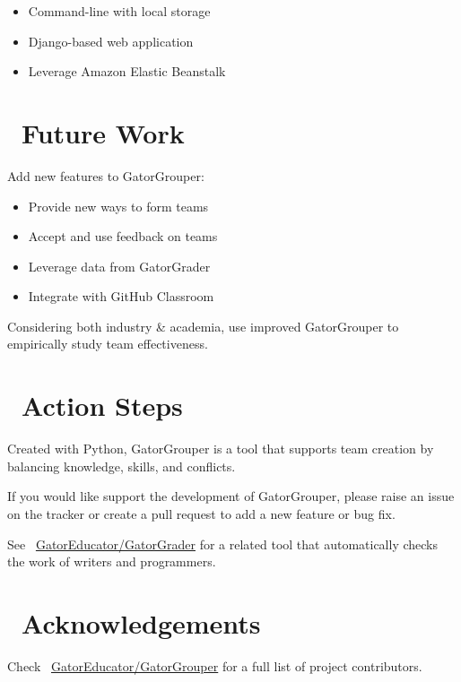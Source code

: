 \documentclass[a0paper,fleqn]{betterposter}
\begin{document}
{\begin{itemize}[leftmargin=*]
    \item{Command-line with local storage}
    \item{Django-based web application}
    \item{Leverage Amazon Elastic Beanstalk}

  \end{itemize}

  \section{\faDashboard~Future Work}
  Add new features to GatorGrouper: \\
  \vspace*{-.5in}

  \begin{itemize}[leftmargin=*]

    \item{Provide new ways to form teams}
    \item{Accept and use feedback on teams}
    \item{Leverage data from GatorGrader}
    \item{Integrate with GitHub Classroom}

  \end{itemize}

  \vspace{.5em}
  Considering both industry \& academia, use improved GatorGrouper to
  empirically study team effectiveness.

  \section{\faRocket~Action Steps}
  Created with Python, GatorGrouper is a tool that supports team creation by
  balancing knowledge, skills, and conflicts.

  \vspace*{.25in}
  If you would like support the development of GatorGrouper, please raise an
  issue on the tracker or create a pull request to add a new feature or bug fix.

  \vspace*{.25in}
  See \faGithubAlt~\underline{GatorEducator/GatorGrader} for a related tool that
  automatically checks the work of writers and programmers.

  \section{\faThumbsOUp~Acknowledgements}
  Check \faGithubAlt~\underline{GatorEducator/GatorGrouper} for a full list of
  project contributors.


}
\end{document}
